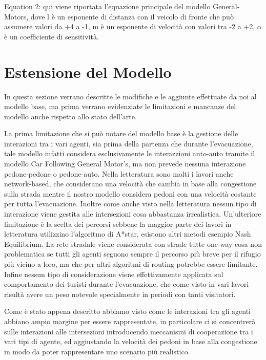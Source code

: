\noindent
Equation 2: qui viene riportata l'equazione principale del modello General-Motors, 
dove l è un esponente di distanza con il veicolo di fronte che può assumere valori da +4 a -1,
m è un esponente di velocità con valori tra -2 a +2, $\alpha$ è un coefficiente di sensitività.






\section{Estensione del Modello}
In questa sezione verrano descritte le modifiche e le aggiunte effettuate da noi al modello base,
ma prima verrano evidenziate le limitazioni e mancanze del modello anche rispetto allo stato dell'arte.

La prima limitazione che si può notare del modello base è la gestione delle interazioni tra i vari agenti,
sia prima della partenza che durante l'evacuazione,
tale modello infatti considera esclusivamente le interazzioni auto-auto tramite il modello Car Following General Motor's,
ma non prevede nessuna interazione pedone-pedone o pedone-auto.
Nella letteratura sono molti i lavori anche network-based,
che considerano una velocità che cambia in base alla congestione sulla strada mentre il nostro modello considera pedoni con una velocità costante per tutta l'evacuazione.
Inoltre come anche visto nella letteratura nessun tipo di interazione viene gestita alle intersezioni cosa abbastanza irrealistica.
Un'ulteriore limitazione è la scelta dei percorsi sebbene la maggior parte dei lavori in letteratura utilizzino l'algoritmo di A*star, esistono altri metodi esempio Nash Equilibrium.
La rete stradale viene considerata con strade tutte one-way cosa non problematica se tutti gli agenti seguono sempre 
il percorso più breve per il rifugio più vicino a loro, ma che per altri algoritmi di routing potrebbe essere limitante.
Infine nessun tipo di considerazione viene effettivamente applicata sul comportamento dei turisti durante l'evacuazione,
che come visto in vari lavori risultà avere un peso notevole specialmente in periodi con tanti visitatori.

Come è stato appena descritto abbiamo visto come le interazioni tra gli agenti
abbiano ampio margine per essere rappresentate, in particolare ci si concentrerà sulle interazioni alle intersezioni
introducendo meccanismi di cooperazione tra i vari tipi di agente, ed aggiustando la velocità dei pedoni in base alla congestione
in modo da poter rappresentare uno scenario più realistico.



